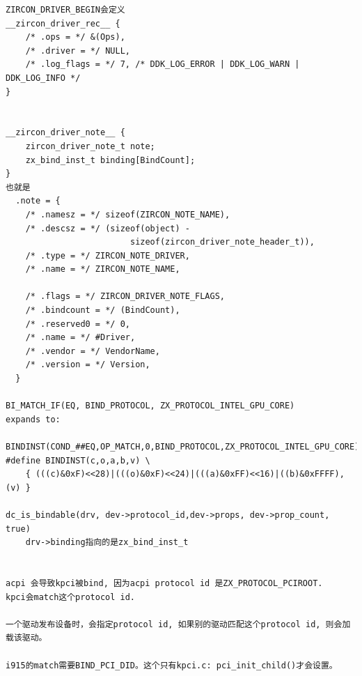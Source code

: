 \begin{verbatim}
ZIRCON_DRIVER_BEGIN会定义
__zircon_driver_rec__ {
    /* .ops = */ &(Ops),
    /* .driver = */ NULL,
    /* .log_flags = */ 7, /* DDK_LOG_ERROR | DDK_LOG_WARN | DDK_LOG_INFO */
}


__zircon_driver_note__ {
    zircon_driver_note_t note;
    zx_bind_inst_t binding[BindCount];
}
也就是
  .note = {
    /* .namesz = */ sizeof(ZIRCON_NOTE_NAME),              
    /* .descsz = */ (sizeof(object) -                       
                         sizeof(zircon_driver_note_header_t)), 
    /* .type = */ ZIRCON_NOTE_DRIVER,                      
    /* .name = */ ZIRCON_NOTE_NAME,  
    
    /* .flags = */ ZIRCON_DRIVER_NOTE_FLAGS,                    
    /* .bindcount = */ (BindCount),                             
    /* .reserved0 = */ 0,                                       
    /* .name = */ #Driver,                                      
    /* .vendor = */ VendorName,                                 
    /* .version = */ Version,            
  }

BI_MATCH_IF(EQ, BIND_PROTOCOL, ZX_PROTOCOL_INTEL_GPU_CORE)
expands to:

BINDINST(COND_##EQ,OP_MATCH,0,BIND_PROTOCOL,ZX_PROTOCOL_INTEL_GPU_CORE)
#define BINDINST(c,o,a,b,v) \
    { (((c)&0xF)<<28)|(((o)&0xF)<<24)|(((a)&0xFF)<<16)|((b)&0xFFFF),(v) }

dc_is_bindable(drv, dev->protocol_id,dev->props, dev->prop_count, true)
    drv->binding指向的是zx_bind_inst_t


acpi 会导致kpci被bind, 因为acpi protocol id 是ZX_PROTOCOL_PCIROOT.
kpci会match这个protocol id.

一个驱动发布设备时，会指定protocol id, 如果别的驱动匹配这个protocol id, 则会加载该驱动。

i915的match需要BIND_PCI_DID。这个只有kpci.c: pci_init_child()才会设置。
\end{verbatim}


